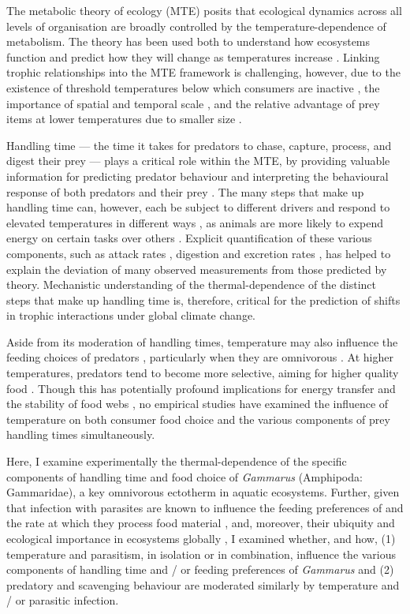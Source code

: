The metabolic theory of ecology (MTE) \citep{brown2004} posits that ecological dynamics across all levels of organisation are broadly controlled by the temperature-dependence of metabolism. The theory has been used both to understand how ecosystems function \citep{ohlund2015, sentis2015, ogorman2017} and predict how they will change as temperatures increase \citep{oconnor2009, petchey2010}. Linking trophic relationships into the MTE framework is challenging, however, due to the existence of threshold temperatures below which consumers are inactive \citep{ohlund2015}, the importance of spatial and temporal scale \citep{kordas2011}, and the relative advantage of prey items at lower temperatures due to smaller size \citep{dell2011}.

Handling time --- the time it takes for predators to chase, capture, process, and digest their prey \citep{jeschke2002} --- plays a critical role within the MTE, by providing valuable information for predicting predator behaviour and interpreting the behavioural response of both predators and their prey \citep{rall2012, reuman2014}. The many steps that make up handling time can, however, each be subject to different drivers and respond to elevated temperatures in different ways \citep{sentis2013}, as animals are more likely to expend energy on certain tasks over others \citep{dell2011}. Explicit quantification of these various components, such as attack rates \citep{ohlund2015}, digestion \citep{sentis2013} and excretion rates \citep{rall2010, enlund2011}, has helped to explain the deviation of many observed measurements from those predicted by theory. Mechanistic understanding of the thermal-dependence of the distinct steps that make up handling time is, therefore, critical for the prediction of shifts in trophic interactions under global climate change. 

Aside from its moderation of handling times, temperature may also influence the feeding choices of predators \citep{ferrari2015}, particularly when they are omnivorous  \citep{boersma2016}. At higher temperatures, predators tend to become more selective, aiming for higher quality food \citep{gordon2018}. Though this has potentially profound implications for energy transfer and the stability of food webs \citep{ogorman2016}, no empirical studies have examined the influence of temperature on both consumer food choice and the various components of prey handling times simultaneously. 

Here, I examine experimentally the thermal-dependence of the specific components of handling time and food choice of \emph{Gammarus} (Amphipoda: Gammaridae), a key omnivorous ectotherm in aquatic ecosystems. Further, given that infection with parasites are known to influence the feeding preferences of  \citep{bunke2015} and the rate at which they process food material \citep{labaude2016}, and, moreover, their ubiquity and ecological importance in ecosystems globally \citep{poulin2018the}, I examined whether, and how, (1) temperature and parasitism, in isolation or in combination, influence the various components of handling time and / or feeding preferences of \emph{Gammarus} and (2) predatory and scavenging behaviour are moderated similarly by temperature and / or parasitic infection. 

